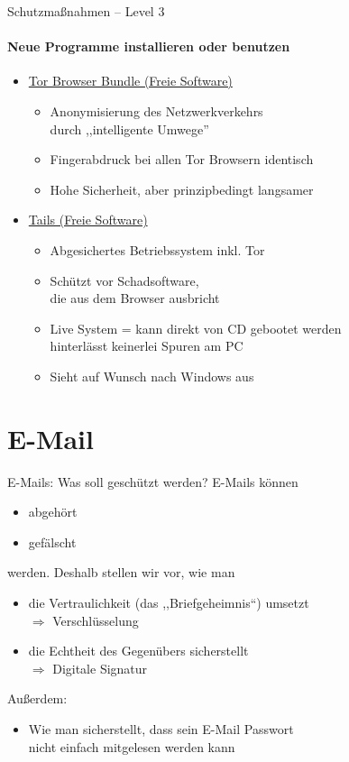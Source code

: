   \begin{frame}{Schutzmaßnahmen -- Level 3}
  \framesubtitle{Neue Programme installieren oder benutzen}
    \begin{itemize}
      \item \href{https://www.torproject.org}{Tor Browser Bundle (Freie Software)}
      \begin{itemize}
        \item Anonymisierung des Netzwerkverkehrs\\durch ,,intelligente Umwege''
        \item Fingerabdruck bei allen Tor Browsern identisch
        \item Hohe Sicherheit, aber prinzipbedingt langsamer
      \end{itemize}
      \item \href{https://tails.boum.org}{Tails (Freie Software)}
      \begin{itemize}
        \item Abgesichertes Betriebssystem inkl. Tor
        \item Schützt vor Schadsoftware,\\ die aus dem Browser ausbricht
        \item Live System = kann direkt von CD gebootet werden\\ hinterlässt keinerlei Spuren am PC
        \item Sieht auf Wunsch nach Windows aus
      \end{itemize}
    \end{itemize}
  \end{frame}

\section{E-Mail}
  \begin{frame}{E-Mails: Was soll geschützt werden?}
    E-Mails können
    \begin{itemize}
      \item abgehört
      \item gefälscht
    \end{itemize}
    werden. Deshalb stellen wir vor, wie man
    \begin{itemize}
      \item die Vertraulichkeit (das ,,Briefgeheimnis``) umsetzt
      \\ $\Rightarrow$ Verschlüsselung
      \item die Echtheit des Gegenübers sicherstellt
      \\ $\Rightarrow$ Digitale Signatur
    \end{itemize}
    Außerdem:
    \begin{itemize}
      \item Wie man sicherstellt, dass sein E-Mail Passwort\\ nicht einfach mitgelesen werden kann
    \end{itemize}
  \end{frame}

